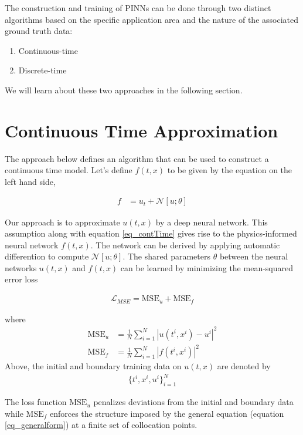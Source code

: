 \documentclass[book.tex]{subfiles}
\begin{document}
The construction and training of PINNs can be done through two distinct algorithms based on the specific application area and the nature of the associated ground truth data:
\begin{enumerate}
    \item Continuous-time 
    \item Discrete-time 
\end{enumerate} 
We will learn about these two approaches in the following section. 
\section{Continuous Time Approximation}

The approach below defines an algorithm that can be used to construct a continuous time model. Let's define $f(t, x)$ to be given by the equation on the left hand side,

\begin{align}
    f &=u_t + \mathcal{N}[u; \theta]
    \label{eq_contTime}
\end{align}

Our approach is to approximate $u(t,x)$ by a deep neural network. This assumption along with equation \ref{eq_contTime} gives rise to the physics-informed neural network $f(t,x)$. The network can be derived by applying automatic differention to compute $\mathcal{N}[u; \theta]$. The shared parameters $\theta$ between the neural networks $u(t, x)$ and $f(t, x)$ can be learned by minimizing the mean-squared error loss

\begin{align}
    \mathcal{L}_{MSE}=\textrm{MSE}_u + \textrm{MSE}_f 
\end{align}

where 
\begin{align}
    \textrm{MSE}_u &=\frac{1}{N} \sum_{i=1}^{N}|u(t^i,x^i)-u^i|^2\\
    \textrm{MSE}_f &=\frac{1}{N} \sum_{i=1}^{N}|f(t^i,x^i)|^2
\end{align}
Above, the initial and boundary training data on $u(t, x)$ are denoted by 
\begin{align}
\{{t^i, x^i, u^i}\}^{N}_{i=1}
\end{align} 

The loss function $\textrm{MSE}_u$ penalizes deviations from the initial and boundary data while $\textrm{MSE}_f$ enforces the structure imposed by the general equation (equation \ref{eq_generalform}) at a finite set of collocation points. 
\end{document}
